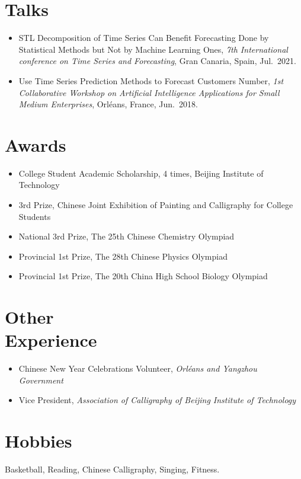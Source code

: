 \documentclass{mycv}
\begin{document}
\section{Talks}

\begin{itemize}
  \item STL Decomposition of Time Series Can Benefit Forecasting Done by Statistical Methods but Not by Machine Learning Ones, \emph{7th International conference on Time Series and Forecasting}, Gran Canaria, Spain, Jul.~2021.
  \item Use Time Series Prediction Methods to Forecast Customers Number, \emph{1st Collaborative Workshop on Artificial Intelligence Applications for Small Medium Enterprises}, Orl\'eans, France, Jun.~2018.
\end{itemize}

\section{Awards}

\begin{itemize}
  \item College Student Academic Scholarship, 4 times, Beijing Institute of Technology 
  \item 3rd Prize, Chinese Joint Exhibition of Painting and Calligraphy for College Students 
  \item National 3rd Prize, The 25th Chinese Chemistry Olympiad 
  \item Provincial 1st Prize, The 28th Chinese Physics Olympiad 
  \item Provincial 1st Prize, The 20th China High School Biology Olympiad 
\end{itemize}

\section{Other \\ Experience}

\begin{itemize}
    \item Chinese New Year Celebrations Volunteer, \emph{Orl\'eans and Yangzhou Government} 
    \item Vice President, \emph{Association of Calligraphy of Beijing Institute of Technology} 
\end{itemize}

\section{Hobbies}

Basketball, Reading, Chinese Calligraphy, Singing, Fitness.
\end{document}
